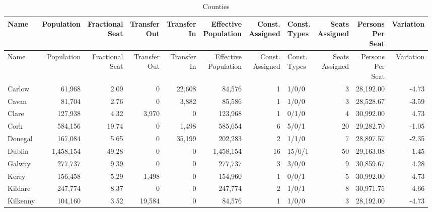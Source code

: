 \documentclass[a4paper]{article}
\begin{document}
\begin{longtable}{lrrrrrrlrrr}
\caption{Counties}
\\ \toprule
Name &Population &\shortstack{Fractional\\Seat} &\shortstack{Transfer\\Out} &\shortstack{Transfer\\In} &\shortstack{Effective\\Population} &\shortstack{Const.\\Assigned} &\shortstack{Const.\\Types} &\shortstack{Seats\\Assigned} &\shortstack{Persons\\Per\\Seat} &Variation \\ \midrule
\endfirsthead
\toprule
Name &Population &\shortstack{Fractional\\Seat} &\shortstack{Transfer\\Out} &\shortstack{Transfer\\In} &\shortstack{Effective\\Population} &\shortstack{Const.\\Assigned} &\shortstack{Const.\\Types} &\shortstack{Seats\\Assigned} &\shortstack{Persons\\Per\\Seat} &Variation \\ \midrule
\endhead
\bottomrule
\endfoot
Carlow&61,968& 2.09&0&22,608&84,576&1&1/0/0&3&28,192.00&-4.73\\ 
Cavan&81,704& 2.76&0&3,882&85,586&1&1/0/0&3&28,528.67&-3.59\\ 
Clare&127,938& 4.32&3,970&0&123,968&1&0/1/0&4&30,992.00& 4.73\\ 
Cork&584,156&19.74&0&1,498&585,654&6&5/0/1&20&29,282.70&-1.05\\ 
Donegal&167,084& 5.65&0&35,199&202,283&2&1/1/0&7&28,897.57&-2.35\\ 
Dublin&1,458,154&49.28&0&0&1,458,154&16&15/0/1&50&29,163.08&-1.45\\ 
Galway&277,737& 9.39&0&0&277,737&3&3/0/0&9&30,859.67& 4.28\\ 
Kerry&156,458& 5.29&1,498&0&154,960&1&0/0/1&5&30,992.00& 4.73\\ 
Kildare&247,774& 8.37&0&0&247,774&2&1/0/1&8&30,971.75& 4.66\\ 
Kilkenny&104,160& 3.52&19,584&0&84,576&1&1/0/0&3&28,192.00&-4.73\\ 

\end{longtable}
\end{document}
